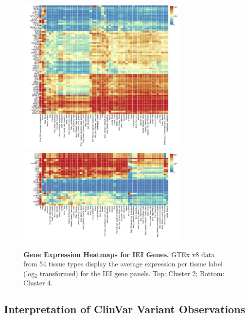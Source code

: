 \begin{figure}[ht]
\centering
\includegraphics[width=0.75\textwidth]{../images/expHeat_FUMA_jobs604419_var_risk_est_cluster_2.png}
\includegraphics[width=0.75\textwidth]{../images/expHeat_FUMA_jobs604403_var_risk_est_cluster_4.png}
\caption{\textbf{Gene Expression Heatmaps for IEI Genes.} GTEx v8 data from 54 tissue types display the average expression per tissue label (log\(_2\) transformed) for the IEI gene panels. Top: Cluster 2; Bottom: Cluster 4.}
\label{fig:expHeatmaps}
\end{figure}

\FloatBarrier
\subsection{Interpretation of ClinVar Variant Observations}

